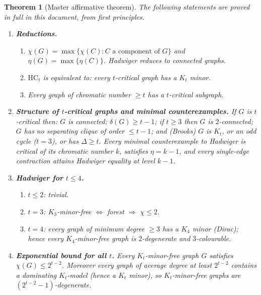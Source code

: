 \documentclass[11pt]{article}
\newtheorem{theorem}{Theorem}[section]
\theoremstyle{definition}
\newcommand{\had}{\eta}
\begin{document}
\begin{theorem}[Master affirmative theorem]\label{thm:master}
The following statements are proved in full in this document, from first
principles.
\begin{enumerate}
\item \textbf{Reductions.}
\begin{enumerate}
\item \(\chi(G)=\max\{\chi(C):C\text{ a component of }G\}\) and
\(\had(G)=\max\{\had(C)\}\). Hadwiger reduces to connected graphs.
\item \(\mathrm{HC}_t\) is equivalent to: every \(t\)-critical graph has a
\(K_t\) minor.
\item Every graph of chromatic number \(\ge t\) has a \(t\)-critical subgraph.
\end{enumerate}

\item \textbf{Structure of \(t\)-critical graphs and minimal counterexamples.}
If \(G\) is \(t\)-critical then: \(G\) is connected; \(\delta(G)\ge t-1\); if
\(t\ge 3\) then \(G\) is \(2\)-connected; \(G\) has no separating clique of order
\(\le t-1\); and (Brooks) \(G\) is \(K_t\), or an odd cycle (\(t=3\)), or has
\(\Delta\ge t\). Every minimal counterexample to Hadwiger is critical of its
chromatic number \(k\), satisfies \(\had=k-1\), and every single-edge contraction
attains Hadwiger equality at level \(k-1\).

\item \textbf{Hadwiger for \(t\le 4\).}
\begin{enumerate}
\item \(t\le 2\): trivial.
\item \(t=3\): \(K_3\)-minor-free \(\Leftrightarrow\) forest \(\Rightarrow\) \(\chi\le 2\).
\item \(t=4\): every graph of minimum degree \(\ge 3\) has a \(K_4\) minor
(Dirac); hence every \(K_4\)-minor-free graph is \(2\)-degenerate and
\(3\)-colourable.
\end{enumerate}

\item \textbf{Exponential bound for all \(t\).}
Every \(K_t\)-minor-free graph \(G\) satisfies \(\chi(G)\le 2^{t-2}\). Moreover
every graph of average degree at least \(2^{t-2}\) contains a dominating
\(K_t\)-model (hence a \(K_t\) minor), so \(K_t\)-minor-free graphs are
\((2^{t-2}-1)\)-degenerate.


\end{enumerate}
\end{theorem}
\end{document}
